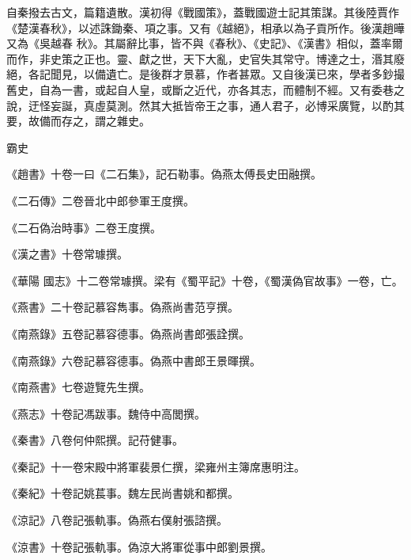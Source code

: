 \begin{pinyinscope}
 自秦撥去古文，篇籍遺散。漢初得《戰國策》，蓋戰國遊士記其策謀。其後陸賈作《楚漢春秋》，以述誅鋤秦、項之事。又有《越絕》，相承以為子貢所作。後漢趙曄又為《吳越春
 秋》。其屬辭比事，皆不與《春秋》、《史記》、《漢書》相似，蓋率爾而作，非史策之正也。靈、獻之世，天下大亂，史官失其常守。博達之士，湣其廢絕，各記聞見，以備遺亡。是後群才景慕，作者甚眾。又自後漢已來，學者多鈔撮舊史，自為一書，或起自人皇，或斷之近代，亦各其志，而體制不經。又有委巷之說，迂怪妄誕，真虛莫測。然其大抵皆帝王之事，通人君子，必博采廣覽，以酌其要，故備而存之，謂之雜史。



 霸史



 《趙書》十卷一曰《二石集》，記石勒事。偽燕太傅長史田融撰。



 《二石傳》二卷晉北中郎參軍王度撰。



 《二石偽治時事》二卷王度撰。



 《漢之書》十卷常璩撰。



 《華陽
 國志》十二卷常璩撰。梁有《蜀平記》十卷，《蜀漢偽官故事》一卷，亡。



 《燕書》二十卷記慕容雋事。偽燕尚書范亨撰。



 《南燕錄》五卷記慕容德事。偽燕尚書郎張詮撰。



 《南燕錄》六卷記慕容德事。偽燕中書郎王景暉撰。



 《南燕書》七卷遊覽先生撰。



 《燕志》十卷記馮跋事。魏侍中高閭撰。



 《秦書》八卷何仲熙撰。記苻健事。



 《秦記》十一卷宋殿中將軍裴景仁撰，梁雍州主簿席惠明注。



 《秦紀》十卷記姚萇事。魏左民尚書姚和都撰。



 《涼記》八卷記張軌事。偽燕右僕射張諮撰。



 《涼書》十卷記張軌事。偽涼大將軍從事中郎劉景撰。




\end{pinyinscope}
